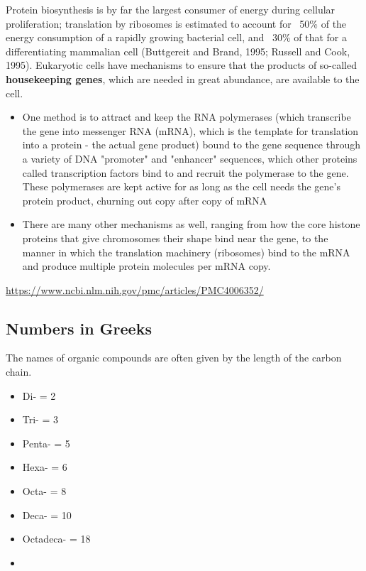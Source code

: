 Protein biosynthesis is by far the largest consumer of energy during cellular
proliferation; translation by ribosomes is estimated to account for ~50\% of the
energy consumption of a rapidly growing bacterial cell, and ~30\% of that for a
differentiating mammalian cell (Buttgereit and Brand, 1995; Russell and Cook,
1995).  Eukaryotic cells have mechanisms to ensure that the products of
so-called {\bf housekeeping genes}, which are needed in great abundance, are
available to the cell.
\begin{itemize}
  \item   One method is to attract and keep the RNA polymerases (which
  transcribe the gene into messenger RNA (mRNA), which is the template for
  translation into a protein - the actual gene product) bound to the gene
  sequence through a variety of DNA "promoter" and "enhancer" sequences, which
  other proteins called transcription factors bind to and recruit the polymerase
  to the gene. These polymerases are kept active for as long as the cell needs
  the gene's protein product, churning out copy after copy of mRNA      
  
  \item There are many other mechanisms as well, ranging from how the core
  histone proteins that give chromosomes their shape bind near the gene, to the
  manner in which the translation machinery (ribosomes) bind to the mRNA and
  produce multiple protein molecules per mRNA copy.   
\end{itemize}
\url{https://www.ncbi.nlm.nih.gov/pmc/articles/PMC4006352/}



\subsection{Numbers in Greeks}
\label{sec:numbers-greeks}

The names of organic compounds are often given by the length of the
carbon chain. 
\begin{itemize}
\item Di-   = 2
\item Tri-  = 3
\item Penta- = 5
\item Hexa- = 6
\item Octa- = 8
\item Deca- = 10
\item Octadeca- = 18
\item 
\end{itemize}

